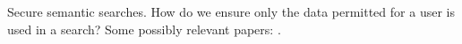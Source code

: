\textsf{Secure semantic searches.  How do we ensure only the data permitted for a user is used in a search?}
Some possibly relevant papers: \cite{Thura2005a,Xia2014a}.
